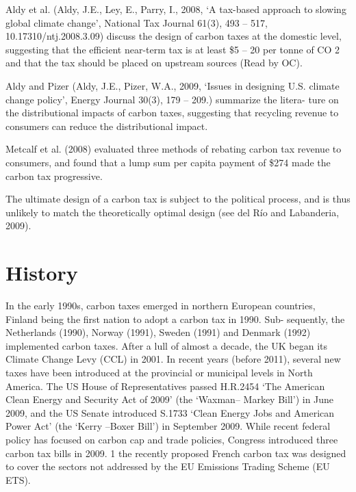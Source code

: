 \documentclass[version=3.21, pagesize, twoside=off, bibliography=totoc, DIV=calc, fontsize=12pt, a4paper]{scrartcl}
\begin{document}
Aldy et al. (Aldy, J.E., Ley, E., Parry, I., 2008, ‘A tax-based approach to slowing global climate change’, National Tax Journal 61(3),
493 – 517, 10.17310/ntj.2008.3.09) discuss the design of carbon taxes
at the domestic level, suggesting that the efficient near-term tax is at least \$5 – 20 per tonne of CO 2 and
that the tax should be placed on upstream sources (Read by OC).
 
Aldy and Pizer (Aldy, J.E., Pizer, W.A., 2009, ‘Issues in designing U.S. climate change policy’, Energy Journal 30(3), 179 – 209.) summarize the litera-
ture on the distributional impacts of carbon taxes, suggesting that recycling revenue to consumers can
reduce the distributional impact.

Metcalf et al. (2008) evaluated three methods of rebating
carbon tax revenue to consumers, and found that a lump sum per capita payment of \$274 made the
carbon tax progressive.

The ultimate design of a carbon tax is subject to the political process, and is thus unlikely to match the theoretically optimal design (see del Río and Labanderia, 2009).

\section{History}
In the early 1990s, carbon taxes emerged
in northern European countries, Finland being the first nation to adopt a carbon tax in 1990. Sub-
sequently, the Netherlands (1990), Norway (1991), Sweden (1991) and Denmark (1992) implemented
carbon taxes. After a lull of almost a decade, the UK began its Climate Change Levy (CCL) in 2001. In
recent years (before 2011), several new taxes have been introduced at the provincial or municipal levels in North
America.
The US House of Representatives
passed H.R.2454 ‘The American Clean Energy and Security Act of 2009’ (the ‘Waxman– Markey Bill’) in
June 2009, and the US Senate introduced S.1733 ‘Clean Energy Jobs and American Power Act’ (the
‘Kerry –Boxer Bill’) in September 2009. While recent federal policy has focused on carbon cap and
trade policies, Congress introduced three carbon tax bills in 2009. 1
the recently proposed French carbon tax was
designed to cover the sectors not addressed by the EU Emissions Trading Scheme (EU ETS).
\end{document}
